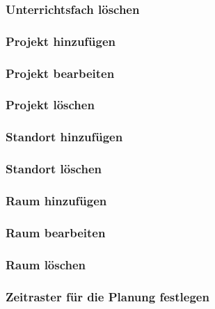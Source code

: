 \documentclass[fontsize=12pt,paper=a4,twoside]{scrartcl}
\begin{document}
\subsubsection{Unterrichtsfach löschen}

\subsubsection{Projekt hinzufügen}

\subsubsection{Projekt bearbeiten}

\subsubsection{Projekt löschen}

\subsubsection{Standort hinzufügen}

\subsubsection{Standort löschen}

\subsubsection{Raum hinzufügen}

\subsubsection{Raum bearbeiten}

\subsubsection{Raum löschen}

\subsubsection{Zeitraster für die Planung festlegen}
\end{document}
